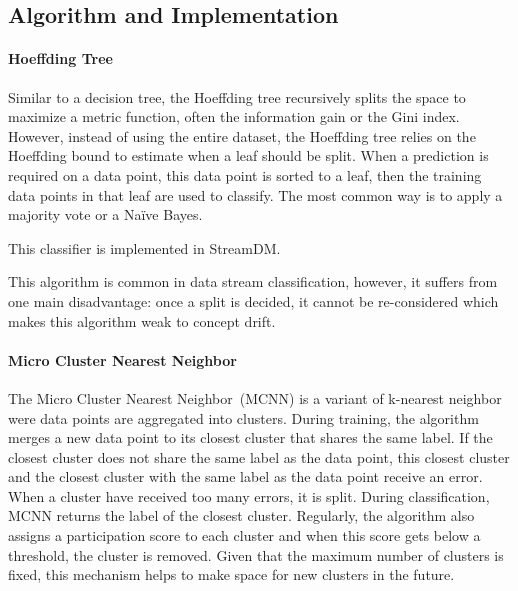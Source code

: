 \subsection{Algorithm and Implementation}
\paragraph{Hoeffding Tree~\cite{VFDT}}
Similar to a decision tree, the Hoeffding tree recursively splits the space to maximize a
metric function, often the
information gain or the Gini index. However,
instead of using the entire dataset, the Hoeffding
tree relies on the Hoeffding bound to estimate
when a leaf should be split. When a prediction is required on a
data point, this data point is sorted to a leaf,
then the training data points in that leaf are
used to classify. The most common way is to apply a
majority vote or a Naïve Bayes.

This classifier is implemented in StreamDM.

This algorithm is common in data stream
classification, however, it suffers from one main
disadvantage: once a split is decided, it cannot
be re-considered which makes this algorithm weak
to concept drift.

\paragraph{Micro Cluster Nearest Neighbor~\cite{mc-nn}}
The Micro Cluster Nearest Neighbor~(MCNN) is a
variant of k-nearest neighbor were data points are
aggregated into clusters.  During training, the
algorithm merges a new data point to its closest
cluster that shares the same label. If the closest
cluster does not share the same label as the data
point, this closest cluster and the closest
cluster with the same label as the data point
receive an error. When a cluster have received too
many errors, it is split. During classification,
MCNN returns the label of the closest cluster.
Regularly, the algorithm also assigns a
participation score to each cluster and when this
score gets below a threshold, the cluster is
removed. Given that the maximum number of clusters
is fixed, this mechanism helps to make space for
new clusters in the future.  

